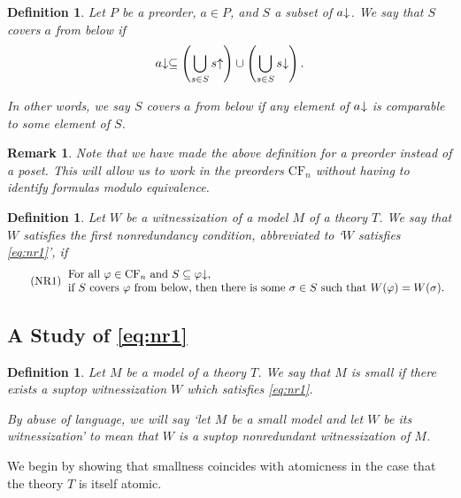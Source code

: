\documentclass{article}
\newtheorem{remark}[theorem]{Remark}
\newtheorem{definition}[theorem]{Definition}
\theoremstyle{nonumberplain}
\newcommand{\CF}{\mathrm{CF}}
\newcommand{\upcl}[1]{{#1}\hspace{-0.25em}\uparrow}
\newcommand{\dncl}[1]{{#1}\hspace{-0.25em}\downarrow}
\begin{document}
\begin{definition}
Let $P$ be a preorder, $a \in P$, and $S$ a subset of $\dncl a$. We say that $S$ covers $a$ from below if
\begin{equation}
\dncl a \subseteq \left( \bigcup_{s \in S} \upcl s \right) \cup \left( \bigcup_{s \in S} \dncl s \right).
\end{equation}

In other words, we say $S$ covers $a$ from below if any element of $\dncl a$ is comparable to some element of $S$.
\end{definition}

\begin{remark}
Note that we have made the above definition for a preorder instead of a poset. This will allow us to work in the preorders $\CF_n$ without having to identify formulas modulo equivalence.
\end{remark}

\begin{definition}
Let $W$ be a witnessization of a model $M$ of a theory $T$. We say that $W$ satisfies the \emph{first nonredundancy condition}, abbreviated to `$W$ satisfies \eqref{eq:nr1}', if
\begin{equation}
\tag{NR1}\label{eq:nr1}
\begin{tabular}{ll}
For all $\varphi \in \CF_n$ and $S \subseteq \dncl\varphi$,\\
if $S$ covers $\varphi$ from below, then there is some $\sigma \in S$ such that $W(\varphi) = W(\sigma)$.
\end{tabular}
\end{equation}
\end{definition}

\subsection{A Study of \eqref{eq:nr1}}

\begin{definition}
Let $M$ be a model of a theory $T$. We say that $M$ is \emph{small} if there exists a suptop witnessization $W$ which satisfies \eqref{eq:nr1}.

By abuse of language, we will say `let $M$ be a small model and let $W$ be its witnessization' to mean that $W$ is a suptop nonredundant witnessization of $M$.
\end{definition}

We begin by showing that smallness coincides with atomicness in the case that the theory $T$ is itself atomic.
\end{document}
